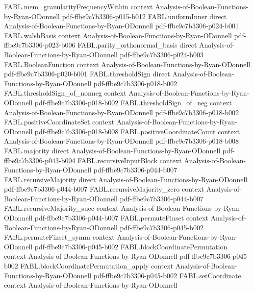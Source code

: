 \begin{theorem}
\proofstep
  {FABL.mem_granularityFrequencyWithin}
  {context}
  {Analysis-of-Boolean-Functions-by-Ryan-ODonnell}
  {pdf-ffbe9c7b3306-p015-b012}
\proofstep
  {FABL.uniformInner}
  {direct}
  {Analysis-of-Boolean-Functions-by-Ryan-ODonnell}
  {pdf-ffbe9c7b3306-p024-b001}
\proofstep
  {FABL.walshBasis}
  {context}
  {Analysis-of-Boolean-Functions-by-Ryan-ODonnell}
  {pdf-ffbe9c7b3306-p023-b006}
\proofstep
  {FABL.parity_orthonormal_basis}
  {direct}
  {Analysis-of-Boolean-Functions-by-Ryan-ODonnell}
  {pdf-ffbe9c7b3306-p024-b003}
\proofstep
  {FABL.BooleanFunction}
  {context}
  {Analysis-of-Boolean-Functions-by-Ryan-ODonnell}
  {pdf-ffbe9c7b3306-p020-b001}
\proofstep
  {FABL.thresholdSign}
  {direct}
  {Analysis-of-Boolean-Functions-by-Ryan-ODonnell}
  {pdf-ffbe9c7b3306-p018-b002}
\proofstep
  {FABL.thresholdSign_of_nonneg}
  {context}
  {Analysis-of-Boolean-Functions-by-Ryan-ODonnell}
  {pdf-ffbe9c7b3306-p018-b002}
\proofstep
  {FABL.thresholdSign_of_neg}
  {context}
  {Analysis-of-Boolean-Functions-by-Ryan-ODonnell}
  {pdf-ffbe9c7b3306-p018-b002}
\proofstep
  {FABL.positiveCoordinateSet}
  {context}
  {Analysis-of-Boolean-Functions-by-Ryan-ODonnell}
  {pdf-ffbe9c7b3306-p018-b008}
\proofstep
  {FABL.positiveCoordinateCount}
  {context}
  {Analysis-of-Boolean-Functions-by-Ryan-ODonnell}
  {pdf-ffbe9c7b3306-p018-b008}
\proofstep
  {FABL.majority}
  {direct}
  {Analysis-of-Boolean-Functions-by-Ryan-ODonnell}
  {pdf-ffbe9c7b3306-p043-b004}
\proofstep
  {FABL.recursiveInputBlock}
  {context}
  {Analysis-of-Boolean-Functions-by-Ryan-ODonnell}
  {pdf-ffbe9c7b3306-p044-b007}
\proofstep
  {FABL.recursiveMajority}
  {direct}
  {Analysis-of-Boolean-Functions-by-Ryan-ODonnell}
  {pdf-ffbe9c7b3306-p044-b007}
\proofstep
  {FABL.recursiveMajority_zero}
  {context}
  {Analysis-of-Boolean-Functions-by-Ryan-ODonnell}
  {pdf-ffbe9c7b3306-p044-b007}
\proofstep
  {FABL.recursiveMajority_succ}
  {context}
  {Analysis-of-Boolean-Functions-by-Ryan-ODonnell}
  {pdf-ffbe9c7b3306-p044-b007}
\proofstep
  {FABL.permuteFinset}
  {context}
  {Analysis-of-Boolean-Functions-by-Ryan-ODonnell}
  {pdf-ffbe9c7b3306-p045-b002}
\proofstep
  {FABL.permuteFinset_symm}
  {context}
  {Analysis-of-Boolean-Functions-by-Ryan-ODonnell}
  {pdf-ffbe9c7b3306-p045-b002}
\proofstep
  {FABL.blockCoordinatePermutation}
  {context}
  {Analysis-of-Boolean-Functions-by-Ryan-ODonnell}
  {pdf-ffbe9c7b3306-p045-b002}
\proofstep
  {FABL.blockCoordinatePermutation_apply}
  {context}
  {Analysis-of-Boolean-Functions-by-Ryan-ODonnell}
  {pdf-ffbe9c7b3306-p045-b002}
\proofstep
  {FABL.setCoordinate}
  {context}
  {Analysis-of-Boolean-Functions-by-Ryan-ODonnell}

\end{theorem}
